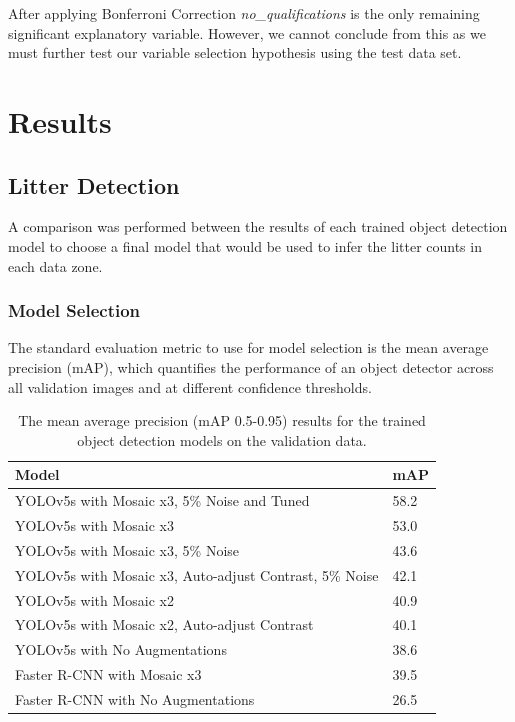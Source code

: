 \documentclass{thesis}
\begin{document}
After applying Bonferroni Correction \textit{no\_qualifications} is the only remaining significant explanatory variable. However, we cannot conclude from this as we must further test our variable selection hypothesis using the test data set.


\chapter{Results} \label{chapter:results}

\section{Litter Detection}

A comparison was performed between the results of each trained object detection model to choose a final model that would be used to infer the litter counts in each data zone.

\subsection{Model Selection}

The standard evaluation metric to use for model selection is the mean average precision (mAP), which quantifies the performance of an object detector across all validation images and at different confidence thresholds.

\begin{table}[ht!]
    \centering
    \begin{tabular}{|l| |l|} 
     \hline
     \textbf{Model} & \textbf{mAP} \\
     \hline\hline
     YOLOv5s with Mosaic x3, 5\% Noise and Tuned & 58.2 \\
     YOLOv5s with Mosaic x3 & 53.0 \\
     YOLOv5s with Mosaic x3, 5\% Noise & 43.6 \\
     YOLOv5s with Mosaic x3, Auto-adjust Contrast, 5\% Noise & 42.1 \\
     YOLOv5s with Mosaic x2 & 40.9  \\
     YOLOv5s with Mosaic x2, Auto-adjust Contrast & 40.1  \\
     YOLOv5s with No Augmentations & 38.6 \\
     Faster R-CNN with Mosaic x3 & 39.5 \\
     Faster R-CNN with No Augmentations & 26.5 \\
     \hline
    \end{tabular}
    \vspace{2mm}
    \caption{The mean average precision (mAP 0.5-0.95) results for the trained object detection models on the validation data.}
    \label{table:model-mAP}
\end{table}
\end{document}
